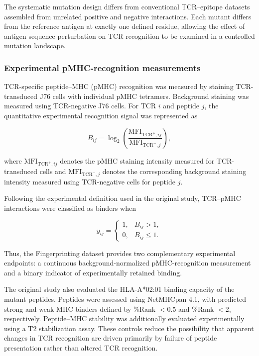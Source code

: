 \documentclass{article}
\begin{document}
The systematic mutation design differs from conventional TCR--epitope
datasets assembled from unrelated positive and negative interactions. Each
mutant differs from the reference antigen at exactly one defined residue,
allowing the effect of antigen sequence perturbation on TCR recognition to be
examined in a controlled mutation landscape.


\subsubsection{Experimental pMHC-recognition measurements}

TCR-specific peptide--MHC (pMHC) recognition was measured by staining
TCR-transduced J76 cells with individual pMHC tetramers. Background staining
was measured using TCR-negative J76 cells. For TCR $i$ and peptide $j$, the
quantitative experimental recognition signal was represented as

\begin{equation}
B_{ij}
=
\log_2
\left(
\frac{\mathrm{MFI}_{\mathrm{TCR}^{+},ij}}
     {\mathrm{MFI}_{\mathrm{TCR}^{-},j}}
\right),
\label{eq:binding_signal}
\end{equation}

where $\mathrm{MFI}_{\mathrm{TCR}^{+},ij}$ denotes the pMHC staining
intensity measured for TCR-transduced cells and
$\mathrm{MFI}_{\mathrm{TCR}^{-},j}$ denotes the corresponding background
staining intensity measured using TCR-negative cells for peptide $j$.

Following the experimental definition used in the original study,
TCR--pMHC interactions were classified as binders when

\begin{equation}
y_{ij}
=
\begin{cases}
1, & B_{ij} > 1,\\
0, & B_{ij} \leq 1.
\end{cases}
\label{eq:binary_label}
\end{equation}

Thus, the Fingerprinting dataset provides two complementary experimental
endpoints: a continuous background-normalized pMHC-recognition measurement
and a binary indicator of experimentally retained binding.

The original study also evaluated the HLA-A*02:01 binding capacity of the
mutant peptides. Peptides were assessed using NetMHCpan 4.1, with predicted
strong and weak MHC binders defined by \%Rank $<0.5$ and \%Rank $<2$,
respectively. Peptide--MHC stability was additionally evaluated
experimentally using a T2 stabilization assay. These controls reduce the
possibility that apparent changes in TCR recognition are driven primarily by
failure of peptide presentation rather than altered TCR recognition.
\end{document}
